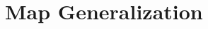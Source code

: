 \documentclass[11pt, oneside]{report}
\begin{document}
{%




\chapter{Map Generalization}
\label{chapter:state:of:the:art:map:generalization}

}
\end{document}
